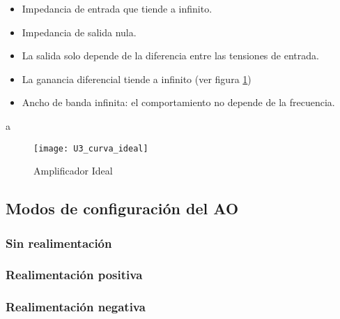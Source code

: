 \begin{itemize}
	\item Impedancia de entrada que tiende a infinito.
	\item Impedancia de salida nula.
	\item La salida solo depende de la diferencia entre las tensiones de entrada.
	\item La ganancia diferencial tiende a infinito (ver figura \ref{fig:caracteristica-ideal})
	\item Ancho de banda infinita: el comportamiento no depende de la frecuencia.
\end{itemize}

a\begin{figure}[h]
	\centering
	\texttt{[image: U3\_curva\_ideal]}
	\caption{Amplificador Ideal}
	\label{fig:caracteristica-ideal}
\end{figure}

\subsection{Modos de configuración del AO}

\subsubsection{Sin realimentación}
\subsubsection{Realimentación positiva}
\subsubsection{Realimentación negativa}
